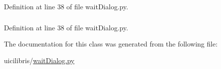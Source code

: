 \-Definition at line 38 of file wait\-Dialog.\-py.

\hypertarget{classuicilibris_1_1waitDialog_1_1spinWheelWaitDialog_a86ba95c8db0c48e34eaad4f6088fdcc3}{
\subsubsection[{timer}]{}}\label{classuicilibris_1_1waitDialog_1_1spinWheelWaitDialog_a86ba95c8db0c48e34eaad4f6088fdcc3}


\-Definition at line 38 of file wait\-Dialog.\-py.



\-The documentation for this class was generated from the following file\-:\begin{DoxyCompactItemize}
\item 
uicilibris/\hyperlink{waitDialog_8py}{wait\-Dialog.\-py}\end{DoxyCompactItemize}
